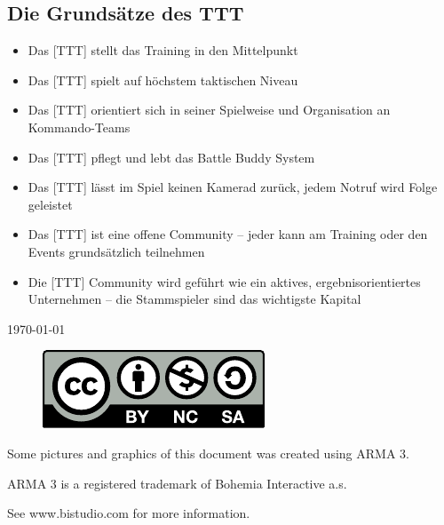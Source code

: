 \subsection*{Die Grundsätze des TTT}
\label{sec:Grundsaetze}
	\begin{itemize}
		\item Das [TTT] stellt das Training in den Mittelpunkt
		\item Das [TTT] spielt auf höchstem taktischen Niveau
		\item Das [TTT] orientiert sich in seiner Spielweise und Organisation an Kommando-Teams
		\item Das [TTT] pflegt und lebt das Battle Buddy System
		\item Das [TTT] lässt im Spiel keinen Kamerad zurück, jedem Notruf wird Folge geleistet
		\item Das [TTT] ist eine offene Community -- jeder kann am Training oder den Events grundsätzlich teilnehmen
		\item Die [TTT] Community wird geführt wie ein aktives, ergebnisorientiertes Unternehmen -- die Stammspieler sind das wichtigste Kapital	
	\end{itemize}

\vspace*{\fill}
	\today
	\begin{figure}[htbp]
		\includegraphics{../img/by-nc-sa}
	\end{figure}

Some pictures and graphics of this document was created using ARMA 3.\par
ARMA 3 is a registered trademark of Bohemia Interactive a.s.\par
See www.bistudio.com for more information.